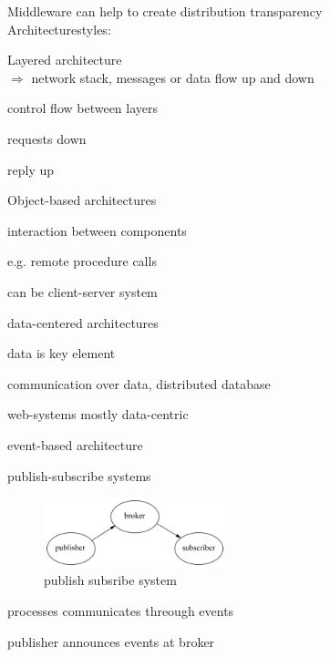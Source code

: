 \documentclass[ngerman,a4paper]{report}
\begin{document}
Middleware can  help to create distribution transparency\\

Architecturestyles:\\
\begin{compactitem}
\item Layered architecture\\
$\Rightarrow$ network stack, messages or data flow up and down\\
\begin{compactitem}
\item control flow between layers
\item requests down
\item reply up
\end{compactitem}
\item Object-based architectures\\
\begin{compactitem}
\item interaction between components
\item e.g. remote procedure calls
\item can be client-server system
\end{compactitem}
\item data-centered architectures\\
\begin{compactitem}
\item data is key element
\item communication over data, distributed database
\item web-systems mostly data-centric
\end{compactitem}
\item event-based architecture\\
\begin{compactitem}
\item publish-subscribe systems
\begin{figure}[h]
	\centering
	\includegraphics[width=200px]{gfx/pub_sub.png}
	\caption{publish subsribe system}
	\label{img:publish_subscribe}
\end{figure}
\item processes communicates threough events
\item publisher announces events at broker\\

\end{compactitem}
\end{compactitem}
\end{document}

